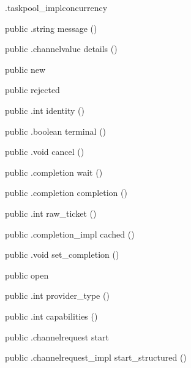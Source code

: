 \begin{CrexxClass}{.taskpool\_impl}{concurrency}
\begin{Members}
    \Method
      {public}
      {.string}
      {message}
      {()}

    \Method
      {public}
      {.channelvalue}
      {details}
      {()}

    \Factory
      {public}
      {new}
      {}

    \Factory
      {public}
      {rejected}
      {}

    \Method
      {public}
      {.int}
      {identity}
      {()}

    \Method
      {public}
      {.boolean}
      {terminal}
      {()}

    \Method
      {public}
      {.void}
      {cancel}
      {()}

    \Method
      {public}
      {.completion}
      {wait}
      {()}

    \Method
      {public}
      {.completion}
      {completion}
      {()}

    \Method
      {public}
      {.int}
      {raw\_ticket}
      {()}

    \Method
      {public}
      {.completion\_impl}
      {cached}
      {()}

    \Method
      {public}
      {.void}
      {set\_completion}
      {()}

    \Factory
      {public}
      {open}
      {}

    \Method
      {public}
      {.int}
      {provider\_type}
      {()}

    \Method
      {public}
      {.int}
      {capabilities}
      {()}

    \Method
      {public}
      {.channelrequest}
      {start}
      {}

    \Method
      {public}
      {.channelrequest\_impl}
      {start\_structured}
      {()}


\end{Members}
\end{CrexxClass}
